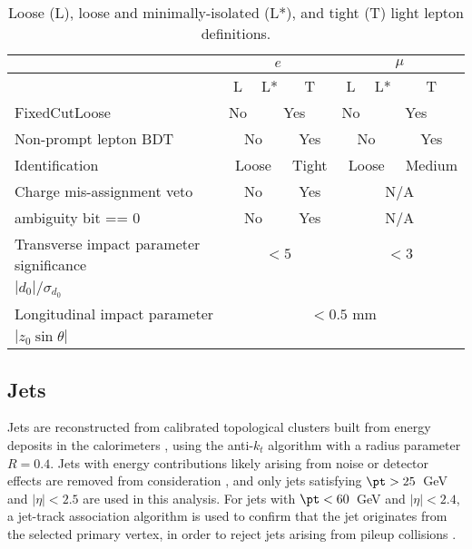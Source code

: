 \begin{table}
\begin{center}
 \begin{tabular}{l|cccccc}
 \hline\hline
 & \multicolumn{3}{c|}{$e$} & \multicolumn{3}{c}{$\mu$} \\
 \hline
 & L & L* & T & L & L* & T \\
  \hline
  FixedCutLoose           &  No & \multicolumn{2}{|c|}{Yes} & No & \multicolumn{2}{|c}{Yes} \\
  \hline
  Non-prompt lepton BDT   &  \multicolumn{2}{c|}{No} & \multicolumn{1}{c|}{Yes} & \multicolumn{2}{c|}{No} & \multicolumn{1}{c}{Yes} \\
  \hline
  Identification  & \multicolumn{2}{c|}{Loose} & \multicolumn{1}{c|}{Tight} & \multicolumn{2}{c}{Loose} & Medium\\
  \hline
  Charge mis-assignment veto &  \multicolumn{2}{c|}{No} & Yes & \multicolumn{3}{|c}{N/A} \\
  \hline
  ambiguity bit == 0 &  \multicolumn{2}{c|}{No} & Yes & \multicolumn{3}{|c}{N/A} \\
  \hline
  Transverse impact parameter significance  &  \multicolumn{3}{c|}{$<5$} & \multicolumn{3}{c}{$<3$ } \\
  $|d_0|/\sigma_{d_0}$ & \multicolumn{3}{c|}{} &  \multicolumn{3}{c}{}  \\
  \hline
  Longitudinal impact parameter &  \multicolumn{6}{c}{$< 0.5$ mm} \\
  $|z_0 \sin \theta|$ &  \multicolumn{6}{c}{} \\
  \hline\hline
 \end{tabular}
\caption{\label{tbl:tightleps} Loose (L), loose and minimally-isolated (L*), and tight (T) light lepton definitions.}
\end{center}
\end{table}


\subsection{Jets}
\label{subsec:jets}
Jets are reconstructed from calibrated topological clusters built from energy deposits in the calorimeters \cite{ATL-PHYS-PUB-2015-015}, using the anti-$k_t$ algorithm with a radius parameter $R=0.4$.  Jets with energy contributions likely arising from noise or detector effects are removed from consideration \cite{ATLAS-CONF-2015-029}, and only jets satisfying $\pt > 25$~GeV and $|\eta| < 2.5$ are used in this analysis.  For jets with $\pt < 60$~GeV and $|\eta| < 2.4$, a jet-track association algorithm is used to confirm that the jet originates from the selected primary vertex, in order to reject jets arising from pileup collisions \cite{PERF-2014-03}.

